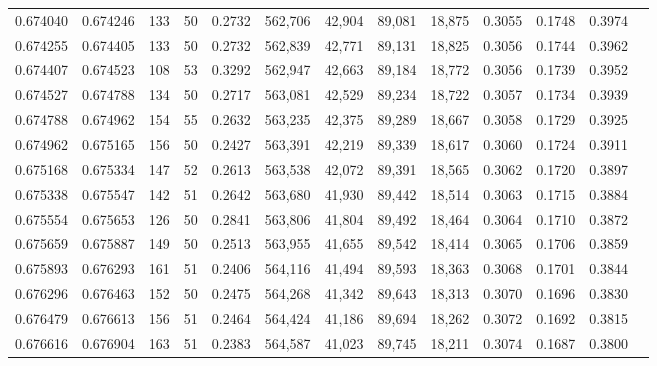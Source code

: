 \begin{tabular}{rrrrrrrrrrrrr}
0.674040 & 0.674246 &   133 &  50 &                                     0.2732 & 562,706 &  42,904 &  89,081 &  18,875 & 0.3055 & 0.1748 & 0.3974 \\
0.674255 & 0.674405 &   133 &  50 &                                     0.2732 & 562,839 &  42,771 &  89,131 &  18,825 & 0.3056 & 0.1744 & 0.3962 \\
0.674407 & 0.674523 &   108 &  53 &                                     0.3292 & 562,947 &  42,663 &  89,184 &  18,772 & 0.3056 & 0.1739 & 0.3952 \\
0.674527 & 0.674788 &   134 &  50 &                                     0.2717 & 563,081 &  42,529 &  89,234 &  18,722 & 0.3057 & 0.1734 & 0.3939 \\
0.674788 & 0.674962 &   154 &  55 &                                     0.2632 & 563,235 &  42,375 &  89,289 &  18,667 & 0.3058 & 0.1729 & 0.3925 \\
0.674962 & 0.675165 &   156 &  50 &                                     0.2427 & 563,391 &  42,219 &  89,339 &  18,617 & 0.3060 & 0.1724 & 0.3911 \\
0.675168 & 0.675334 &   147 &  52 &                                     0.2613 & 563,538 &  42,072 &  89,391 &  18,565 & 0.3062 & 0.1720 & 0.3897 \\
0.675338 & 0.675547 &   142 &  51 &                                     0.2642 & 563,680 &  41,930 &  89,442 &  18,514 & 0.3063 & 0.1715 & 0.3884 \\
0.675554 & 0.675653 &   126 &  50 &                                     0.2841 & 563,806 &  41,804 &  89,492 &  18,464 & 0.3064 & 0.1710 & 0.3872 \\
0.675659 & 0.675887 &   149 &  50 &                                     0.2513 & 563,955 &  41,655 &  89,542 &  18,414 & 0.3065 & 0.1706 & 0.3859 \\
0.675893 & 0.676293 &   161 &  51 &                                     0.2406 & 564,116 &  41,494 &  89,593 &  18,363 & 0.3068 & 0.1701 & 0.3844 \\
0.676296 & 0.676463 &   152 &  50 &                                     0.2475 & 564,268 &  41,342 &  89,643 &  18,313 & 0.3070 & 0.1696 & 0.3830 \\
0.676479 & 0.676613 &   156 &  51 &                                     0.2464 & 564,424 &  41,186 &  89,694 &  18,262 & 0.3072 & 0.1692 & 0.3815 \\
0.676616 & 0.676904 &   163 &  51 &                                     0.2383 & 564,587 &  41,023 &  89,745 &  18,211 & 0.3074 & 0.1687 & 0.3800 \\

\end{tabular}
